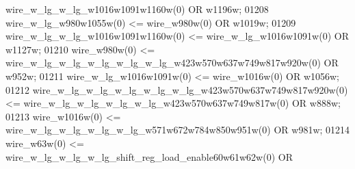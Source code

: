 \begin{DoxyCode}
{{      wire_w_lg_w_lg_w1016w1091w1160w}\textcolor{vhdlchar}{(}\textcolor{vhdllogic}{}\textcolor{vhdllogic}{0}\textcolor{vhdlchar}{)} \textcolor{keywordflow}{OR} \textcolor{vhdlchar}{w1196w};
01208     \textcolor{vhdlchar}{wire_w_lg_w980w1055w}\textcolor{vhdlchar}{(}\textcolor{vhdllogic}{}\textcolor{vhdllogic}{0}\textcolor{vhdlchar}{)} \textcolor{vhdlchar}{<=} \textcolor{vhdlchar}{wire_w980w}\textcolor{vhdlchar}{(}\textcolor{vhdllogic}{}\textcolor{vhdllogic}{0}\textcolor{vhdlchar}{)} \textcolor{keywordflow}{OR} \textcolor{vhdlchar}{w1019w};
01209     \textcolor{vhdlchar}{wire_w_lg_w_lg_w1016w1091w1160w}\textcolor{vhdlchar}{(}\textcolor{vhdllogic}{}\textcolor{vhdllogic}{0}\textcolor{vhdlchar}{)} \textcolor{vhdlchar}{<=} \textcolor{vhdlchar}{wire_w_lg_w1016w1091w}\textcolor{vhdlchar}{(}\textcolor{vhdllogic}{}\textcolor{vhdllogic}{0}\textcolor{vhdlchar}{)} \textcolor{keywordflow}{OR} \textcolor{vhdlchar}{w1127w};
01210     \textcolor{vhdlchar}{wire_w980w}\textcolor{vhdlchar}{(}\textcolor{vhdllogic}{}\textcolor{vhdllogic}{0}\textcolor{vhdlchar}{)} \textcolor{vhdlchar}{<=} \textcolor{vhdlchar}{wire_w_lg_w_lg_w_lg_w_lg_w_lg_w423w570w637w749w817w920w}\textcolor{vhdlchar}{(}\textcolor{vhdllogic}{}\textcolor{vhdllogic}{0}\textcolor{vhdlchar}{)} \textcolor{keywordflow}{OR} \textcolor{vhdlchar}{
      w952w};
01211     \textcolor{vhdlchar}{wire_w_lg_w1016w1091w}\textcolor{vhdlchar}{(}\textcolor{vhdllogic}{}\textcolor{vhdllogic}{0}\textcolor{vhdlchar}{)} \textcolor{vhdlchar}{<=} \textcolor{vhdlchar}{wire_w1016w}\textcolor{vhdlchar}{(}\textcolor{vhdllogic}{}\textcolor{vhdllogic}{0}\textcolor{vhdlchar}{)} \textcolor{keywordflow}{OR} \textcolor{vhdlchar}{w1056w};
01212     \textcolor{vhdlchar}{wire_w_lg_w_lg_w_lg_w_lg_w_lg_w423w570w637w749w817w920w}\textcolor{vhdlchar}{(}\textcolor{vhdllogic}{}\textcolor{vhdllogic}{0}\textcolor{vhdlchar}{)} \textcolor{vhdlchar}{<=} \textcolor{vhdlchar}{
      wire_w_lg_w_lg_w_lg_w_lg_w423w570w637w749w817w}\textcolor{vhdlchar}{(}\textcolor{vhdllogic}{}\textcolor{vhdllogic}{0}\textcolor{vhdlchar}{)} \textcolor{keywordflow}{OR} \textcolor{vhdlchar}{w888w};
01213     \textcolor{vhdlchar}{wire_w1016w}\textcolor{vhdlchar}{(}\textcolor{vhdllogic}{}\textcolor{vhdllogic}{0}\textcolor{vhdlchar}{)} \textcolor{vhdlchar}{<=} \textcolor{vhdlchar}{wire_w_lg_w_lg_w_lg_w_lg_w571w672w784w850w951w}\textcolor{vhdlchar}{(}\textcolor{vhdllogic}{}\textcolor{vhdllogic}{0}\textcolor{vhdlchar}{)} \textcolor{keywordflow}{OR} \textcolor{vhdlchar}{w981w};
01214     \textcolor{vhdlchar}{wire_w63w}\textcolor{vhdlchar}{(}\textcolor{vhdllogic}{}\textcolor{vhdllogic}{0}\textcolor{vhdlchar}{)} \textcolor{vhdlchar}{<=} \textcolor{vhdlchar}{wire_w_lg_w_lg_w_lg_shift_reg_load_enable60w61w62w}\textcolor{vhdlchar}{(}\textcolor{vhdllogic}{}\textcolor{vhdllogic}{0}\textcolor{vhdlchar}{)} \textcolor{keywordflow}{OR} \textcolor{vhdlchar}{
}}
\end{DoxyCode}

